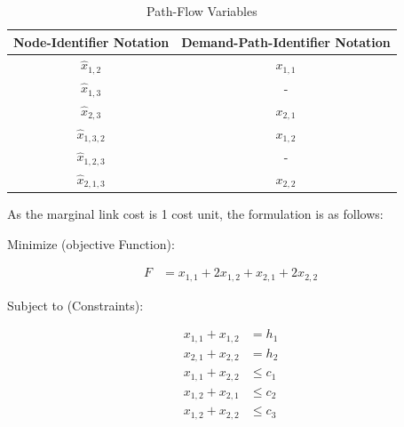 \begin{table}[H]
	\centering
	\caption{Path-Flow Variables}
	\label{tab:p_flowVars}
	\begin{tabular}{||c|c||}
	\hline
	\rowcolor{gray!50}
	Node-Identifier Notation & Demand-Path-Identifier Notation \\
	\hline
	$\hat{x}_{1,2}$ & $x_{1,1}$ \\
	$\hat{x}_{1,3}$ & - \\
	$\hat{x}_{2,3}$ & $x_{2,1}$ \\
	$\hat{x}_{1,3,2}$ & $x_{1,2}$ \\
	$\hat{x}_{1,2,3}$ & - \\
	$\hat{x}_{2,1,3}$ & $x_{2,2}$ \\

	\hline \hline
	\end{tabular}
\end{table}

As the marginal link cost is 1 cost unit, the formulation is as follows:

Minimize (objective Function):

\begin{align*}
	F &= x_{1,1} + 2x_{1,2} + x_{2,1} + 2x_{2,2}
\end{align*}

Subject to (Constraints):

\begin{align*}
	x_{1,1} + x_{1,2} &= h_1 \\
	x_{2,1} + x_{2,2} &= h_2 \\
	x_{1,1} + x_{2,2} &\le c_1 \\
	x_{1,2} + x_{2,1} &\le c_2 \\
	x_{1,2} + x_{2,2} &\le c_3
\end{align*}
